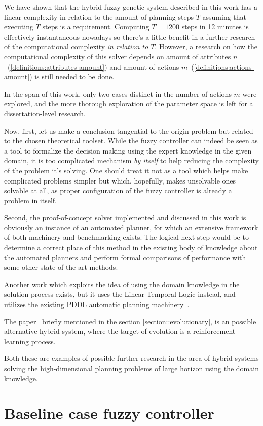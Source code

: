 \documentclass[12pt, a4paper]{report}
\begin{document}
	We have shown that the hybrid fuzzy-genetic system described in this work has a linear complexity in relation to the amount of planning steps $T$ assuming that executing $T$ steps is a requirement.
	Computing $T=1200$ steps in 12 minutes is effectively instantaneous nowadays so there's a little benefit in a further research of the computational complexity \textit{in relation to $T$}.
	However, a research on how the computational complexity of this solver depends on amount of attributes $n$~(\ref{definitions:attributes-amount}) and amount of actions $m$~(\ref{definitions:actions-amount}) is still needed to be done.

	In the span of this work, only two cases distinct in the number of actions $m$ were explored, and the more thorough exploration of the parameter space is left for a dissertation-level research.
	
	Now, first, let us make a conclusion tangential to the origin problem but related to the chosen theoretical toolset.
	While the fuzzy controller can indeed be seen as a tool to formalize the decision making using the expert knowledge in the given domain, it is too complicated mechanism \textit{by itself} to help reducing the complexity of the problem it's solving.
	One should treat it not as a tool which helps make complicated problems simpler but which, hopefully, makes unsolvable ones solvable at all, as proper configuration of the fuzzy controller is already a problem in itself.

	Second, the proof-of-concept solver implemented and discussed in this work is obviously an instance of an automated planner, for which an extensive framework of both machinery and benchmarking exists.
	The logical next step would be to determine a correct place of this method in the existing body of knowledge about the automated planners and perform formal comparisons of performance with some other state-of-the-art methods.

	Another work which exploits the idea of using the domain knowledge in the solution process exists, but it uses the Linear Temporal Logic instead, and utilizes the existing PDDL automatic planning machinery~\cite{LU2025121666}.

	The paper~\cite{song2023rl_ea} briefly mentioned in the section \ref{section::evolutionary}, is an possible alternative hybrid system, where the target of evolution is a reinforcement learning process.

	Both these are examples of possible further research in the area of hybrid systems solving the high-dimensional planning problems of large horizon using the domain knowledge.
	
	\printbibliography

	\appendix
	
	\chapter{Baseline case fuzzy controller}\label{appendix::baseline-case-fuzzy-controller}
	
	
	
\end{document}
